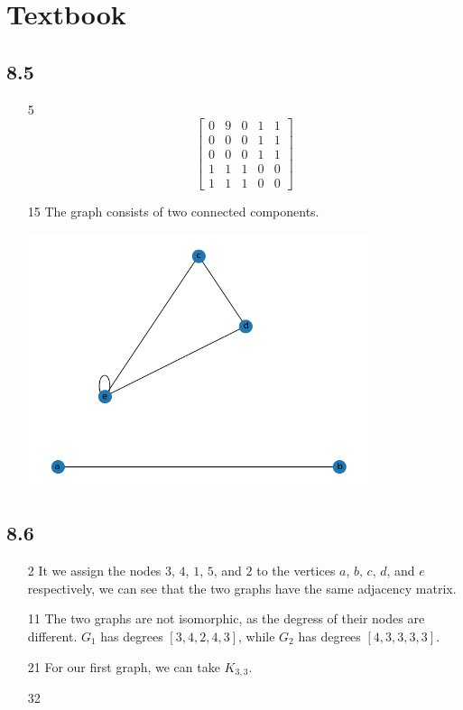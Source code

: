 \documentclass[12pt]{article}
\begin{document}
\section{Textbook}\label{sec:textbook}

\subsection*{8.5}\label{sec:8.5}

\begin{enumerate}
      \item[5] \[\begin{bmatrix}
                        0 & 9 & 0 & 1 & 1 \\
                        0 & 0 & 0 & 1 & 1 \\
                        0 & 0 & 0 & 1 & 1 \\
                        1 & 1 & 1 & 0 & 0 \\
                        1 & 1 & 1 & 0 & 0
                  \end{bmatrix}\]
      \item[15] The graph consists of two connected components.
            \begin{center}
                  \includegraphics[width=10cm]{img/graph}
            \end{center}
\end{enumerate}

\subsection*{8.6}\label{sec:8.6}

\begin{enumerate}
      \item[2] It we assign the nodes $3$, $4$, $1$, $5$, and $2$ to the vertices
            $a$, $b$, $c$, $d$, and $e$ respectively,
            we can see that the two graphs have the same adjacency matrix.
      \item[11] The two graphs are not isomorphic, as the degress of their nodes are different.
      $G_1$ has degrees $[3, 4, 2, 4, 3]$, while $G_2$ has degrees $[4, 3, 3, 3, 3]$.
      \item[21] For our first graph, we can take $K_{3,3}$.
      \item[32]
\end{enumerate}
\end{document}
